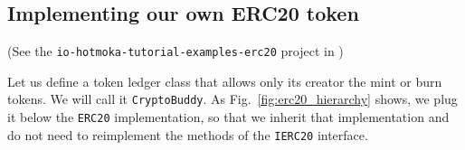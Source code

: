 \subsection{Implementing our own ERC20 token}\label{subsec:implementing_erc20}

\begin{center}
(See the \texttt{io-hotmoka-tutorial-examples-erc20} project in \hotmokaRepo{})
\end{center}

Let us define a token ledger class that allows only its creator the mint or burn tokens.
We will call it \texttt{CryptoBuddy}. As Fig.~\ref{fig:erc20_hierarchy} shows,
we plug it below the \texttt{ERC20} implementation, so that we inherit that implementation
and do not need to reimplement the methods of the \texttt{IERC20} interface.

